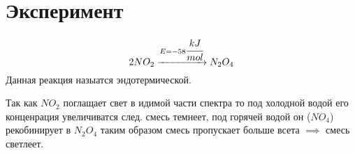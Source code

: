 \section{Эксперимент}
 
\begin{equation} 
  2NO_2 \xrightarrow{E = - 58\cfrac{kJ}{mol}} N_2O_4 
\end{equation} 
\tab Данная реакция назыатся эндотермической.

Так как $NO_2$ поглащает свет в идимой части спектра 
то под холодной водой его конценрация увеличиватся след. 
смесь темнеет, под горячей водой он ($NO_4$) 
рекобинирует в $N_2O_4$ таким образом смесь пропускает 
больше всета $\implies$ смесь светлеет.




